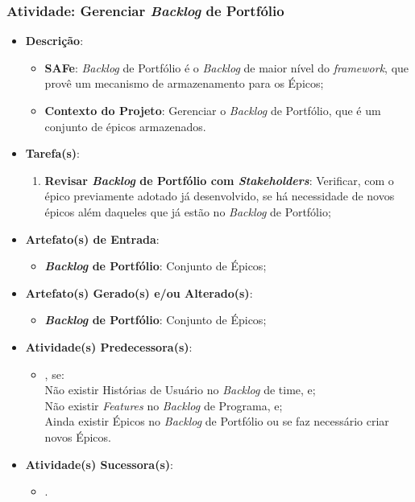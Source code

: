 			\subsubsection[Atividade: Gerenciar \emph{Backlog} de Portfólio]{Atividade: Gerenciar \emph{Backlog} de Portfólio}
			\label{subsubsec:processo_atividade_portfolio_gerenciar}
				\begin{itemize}
					\item{\textbf{Descrição}:
						\begin{itemize}
							\item{\textbf{SAFe}: \emph{Backlog} de Portfólio é o \emph{Backlog} de maior nível do \emph{framework}, que provê um mecanismo de armazenamento para os Épicos;}
							\item{\textbf{Contexto do Projeto}: Gerenciar o \emph{Backlog} de Portfólio, que é um conjunto de épicos armazenados.}
						\end{itemize}}
					\item{\textbf{Tarefa(s)}:
						\begin{enumerate}
							\item{\textbf{Revisar \emph{Backlog} de Portfólio com \emph{Stakeholders}}: Verificar, com o épico previamente adotado já desenvolvido, se há necessidade de novos épicos além daqueles que já estão no \emph{Backlog} de Portfólio;}
						\end{enumerate}}
					\item{\textbf{Artefato(s) de Entrada}:
						\begin{itemize}
							\item{\textbf{\emph{Backlog} de Portfólio}: Conjunto de Épicos;}
						\end{itemize}}
					\item{\textbf{Artefato(s) Gerado(s) e/ou Alterado(s)}:
						\begin{itemize}
							\item{\textbf{\emph{Backlog} de Portfólio}: Conjunto de Épicos;}
						\end{itemize}}
					\item{\textbf{Atividade(s) Predecessora(s)}:
						\begin{itemize}
							\item{, se:
							\\ Não existir Histórias de Usuário no \emph{Backlog} de time, e;
							\\ Não existir \emph{Features} no \emph{Backlog} de Programa, e;
							\\ Ainda existir Épicos no \emph{Backlog} de Portfólio ou se faz necessário criar novos Épicos.}
						\end{itemize}}
					\item{\textbf{Atividade(s) Sucessora(s)}:
						\begin{itemize}
							\item{.}
						\end{itemize}}
				\end{itemize}

